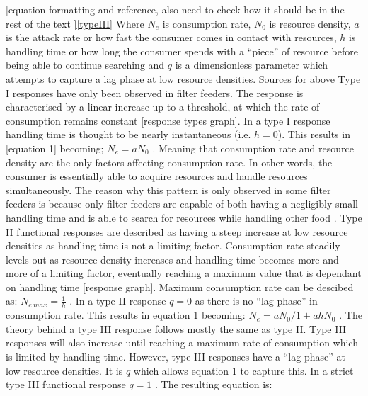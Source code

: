 \documentclass[a4paper]{article}
\numberwithin{equation}{section}
\begin{document}
[equation formatting and reference, also need to check how it should be in the rest of the text ]\eqref{typeIII}
\newline
Where $N_e$ is consumption rate, $N_0$ is resource density, $a$ is the attack rate or how fast the consumer comes in contact with resources, $h$ is handling time or how long the consumer spends with a “piece” of resource before being able to continue searching and $q$ is a dimensionless parameter which attempts to capture a lag phase at low resource densities.
Sources for above
\newline
Type I responses have only been observed in filter feeders\cite{Jeschke2004}.  The response is characterised by a linear increase up to a threshold, at which the rate of consumption remains constant [response types graph].  In a type I response handling time is thought to be nearly instantaneous (i.e. $h = 0$).  This results in [equation 1] becoming;
 $N_e = aN_0$ \cite{Dunn2020}.  
Meaning that consumption rate and resource density are the only factors affecting consumption rate.  In other words, the consumer is essentially able to acquire resources and handle resources simultaneously.  The reason why this pattern is only observed in some filter feeders is because only filter feeders are capable of both having a negligibly small handling time and is able to search for resources while handling other food \cite{Jeschke2004}.
\newline
Type II functional responses are described as having a steep increase at low resource densities as handling time is not a limiting factor.  Consumption rate steadily levels out as resource density increases and handling time becomes more and more of a limiting factor, eventually reaching a maximum value that is dependant on handling time [response graph].  Maximum consumption rate can be descibed as:
$N_{e \ max} = \frac{1}{h}$ \cite{Rosenbaum2018}.
\newline
In a type II response $q = 0$ as there is no “lag phase” in consumption rate.  This results in equation 1 becoming:
 $N_e = aN_0  / 1+ahN_0$  \cite{Rosenbaum2018, Dunn2020}.
\newline
The theory behind a type III response follows mostly the same as type II.  Type III responses will also increase until reaching a maximum rate of consumption which is limited by handling time.  However, type III responses have a “lag phase” at low resource densities.  It is $q$ which allows equation 1 to capture this.  In a strict type III functional response $q = 1$ \cite{Rosenbaum2018}.  The resulting equation is:
\end{document}

